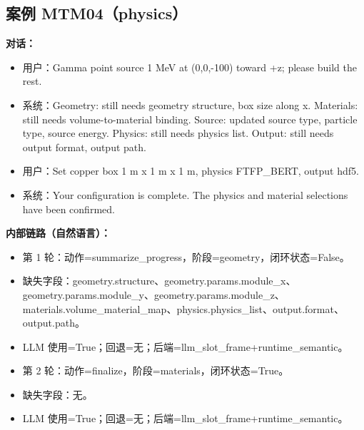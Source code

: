 \documentclass[11pt]{ctexart}
\begin{document}
\subsection{案例 MTM04（physics）}
\textbf{对话：}
\begin{itemize}
\item 用户：Gamma point source 1 MeV at (0,0,-100) toward +z; please build the rest.
\item 系统：Geometry: still needs geometry structure, box size along x. Materials: still needs volume-to-material binding. Source: updated source type, particle type, source energy. Physics: still needs physics list. Output: still needs output format, output path.
\item 用户：Set copper box 1 m x 1 m x 1 m, physics FTFP\_BERT, output hdf5.
\item 系统：Your configuration is complete. The physics and material selections have been confirmed.
\end{itemize}
\textbf{内部链路（自然语言）：}
\begin{itemize}
\item 第 1 轮：动作=summarize\_progress，阶段=geometry，闭环状态=False。
\item 缺失字段：geometry.structure、geometry.params.module\_x、geometry.params.module\_y、geometry.params.module\_z、materials.volume\_material\_map、physics.physics\_list、output.format、output.path。
\item LLM 使用=True；回退=无；后端=llm\_slot\_frame+runtime\_semantic。
\item 第 2 轮：动作=finalize，阶段=materials，闭环状态=True。
\item 缺失字段：无。
\item LLM 使用=True；回退=无；后端=llm\_slot\_frame+runtime\_semantic。
\end{itemize}
\end{document}
